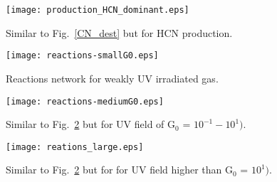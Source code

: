 \documentclass{aa}
\begin{document}
\begin{appendix}
\begin{figure}
\texttt{[image: production\_HCN\_dominant.eps]}
\caption{Similar to Fig.~\ref{CN_dest} but for HCN production.}
\label{HCN_prod}
\end{figure}

\begin{figure}
\texttt{[image: reactions-smallG0.eps]}
\caption{Reactions network for weakly UV irradiated gas.}
\label{reactions_smallG0}
\end{figure}

\begin{figure}
\texttt{[image: reactions-mediumG0.eps]}
\caption{Similar to Fig.~\ref{reactions_smallG0} but for UV field of G$_0$ = $10^{-1} - 10^{1})$.}
\label{reactions_mediumG0}
\end{figure}

\begin{figure}
\texttt{[image: reations\_large.eps]}
\caption{Similar to Fig.~\ref{reactions_smallG0} but for for UV field higher than G$_0$ = $10^{1})$.}
\label{reactions_largeG0}
\end{figure}

\end{appendix}
\end{document}
